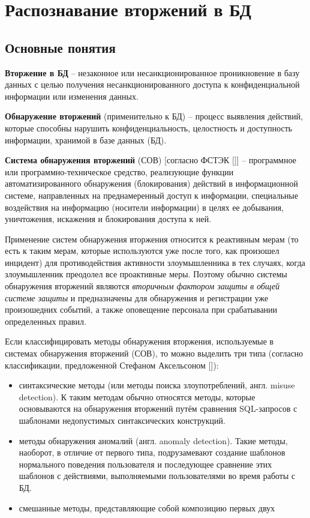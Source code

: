 
\section{Распознавание вторжений в БД}



\subsection{Основные понятия}

\textbf{Вторжение в БД} -- незаконное или несанкционированное проникновение в базу данных с целью получения несанкционированного доступа к конфиденциальной информации или изменения данных.

\textbf{Обнаружение вторжений} (применительно к БД) -- процесс выявления действий,
которые способны нарушить конфиденциальность, целостность и доступность информации,
хранимой в базе данных (БД).

\textbf{Система обнаружения вторжений} (СОВ) [согласно ФСТЭК [\cite{IDSFSTEK}]] -- программное или
программно-техническое средство, реализующие функции автоматизированного обнаружения
(блокирования) действий в информационной системе, направленных на преднамеренный доступ
к информации, специальные воздействия на информацию (носители информации) в целях ее
добывания, уничтожения, искажения и блокирования доступа к ней.

Применение систем обнаружения вторжения относится к реактивным мерам (то есть к таким
мерам, которые используются уже после того, как произошел инцидент) для противодействия
активности злоумышленника в тех случаях, когда злоумышленник преодолел все проактивные
меры. Поэтому обычно системы обнаружения вторжений являются \textit{вторичным фактором
защиты в общей системе защиты} и предназначены для обнаружения и регистрации уже
произошедних событий, а также оповещение персонала при срабатывании определенных правил.

Если классифицировать методы обнаружения вторжения, используемые в системах обнаружения
вторжений (СОВ), то можно выделить три типа (согласно классификации, предложенной
Стефаном Аксельсоном [\cite{IDSClassification}]):
\begin{itemize}
	\item синтаксические методы (или методы поиска злоупотреблений, англ. misuse detection).
		К таким методам обычно относятся методы, которые основываются на обнаружения
		вторжений путём сравнения SQL-запросов с шаблонами недопустимых синтаксических
		конструкций.

	\item методы обнаружения аномалий (англ. anomaly detection).
		Такие методы, наоборот, в отличие от первого типа, подрузамевают создание шаблонов
		нормального поведения пользователя и последующее сравнение этих шаблонов с действиями,
		выполняемыми пользователями во время работы с БД.

	\item смешанные методы, представляющие собой композицию первых двух
\end{itemize}



